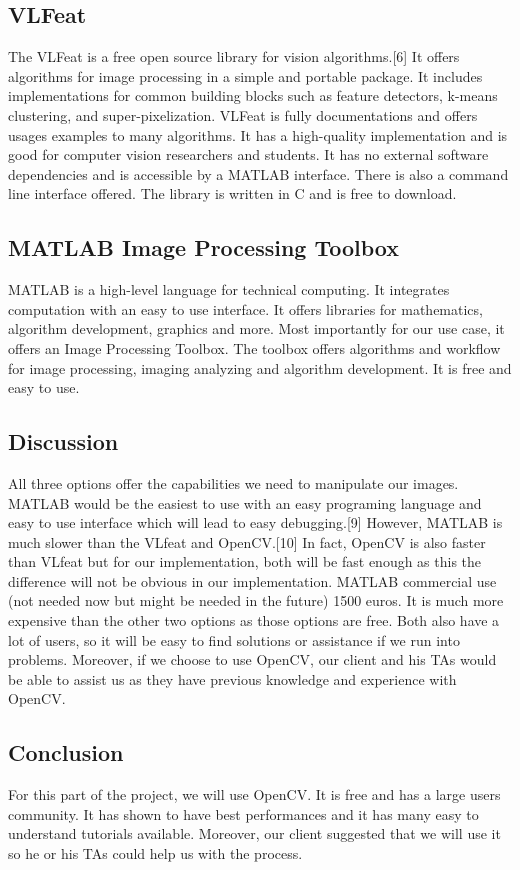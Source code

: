 	\subsection*{VLFeat}
		The VLFeat is a free open source library for vision algorithms.[6] It offers algorithms for image processing in a simple
		and portable package. It includes implementations for common building blocks such as feature detectors, k-means
		clustering, and super-pixelization. VLFeat is fully documentations and offers usages examples to many algorithms. It
		has a high-quality implementation and is good for computer vision researchers and students. It has no external software
		dependencies and is accessible by a MATLAB interface. There is also a command line interface offered. The library is
		written in C and is free to download.
	\subsection*{MATLAB Image Processing Toolbox}
		MATLAB is a high-level language for technical computing. It integrates computation with an easy to use interface. It
		offers libraries for mathematics, algorithm development, graphics and more. Most importantly for our use case, it offers
		an Image Processing Toolbox. The toolbox offers algorithms and workflow for image processing, imaging analyzing and
		algorithm development. It is free and easy to use.
	\subsection*{Discussion}
		All three options offer the capabilities we need to manipulate our images. MATLAB would be the easiest to use with
		an easy programing language and easy to use interface which will lead to easy debugging.[9] However, MATLAB is
		much slower than the VLfeat and OpenCV.[10] In fact, OpenCV is also faster than VLfeat but for our implementation,
		both will be fast enough as this the difference will not be obvious in our implementation. MATLAB commercial use
		(not needed now but might be needed in the future) 1500 euros. It is much more expensive than the other two options
		as those options are free. Both also have a lot of users, so it will be easy to find solutions or assistance if we run into
		problems. Moreover, if we choose to use OpenCV, our client and his TAs would be able to assist us as they have previous
		knowledge and experience with OpenCV.
	\subsection*{Conclusion}	
		For this part of the project, we will use OpenCV. It is free and has a large users community. It has shown to have best
		performances and it has many easy to understand tutorials available. Moreover, our client suggested that we will use it
		so he or his TAs could help us with the process.
